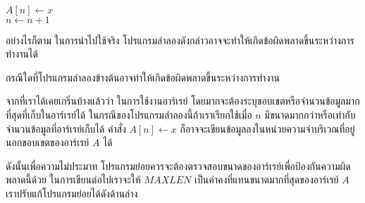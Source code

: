 \begin{algt}
\\
\hspace*{0.2in} $A[n] \leftarrow x$\\
\hspace*{0.2in} $n \leftarrow n + 1$
\end{algt}

อย่างไรก็ตาม ใน{\wbr}การ{\wbr}นำ{\wbr}ไป{\wbr}ใช้{\wbr}จริง โปรแกรม{\wbr}ลำ{\wbr}ลอง{\wbr}ดังกล่าว{\wbr}อาจ{\wbr}จะ{\wbr}ทำ{\wbr}ให้{\wbr}เกิด{\wbr}ข้อผิดพลาด{\wbr}ขึ้น{\wbr}ระหว่าง{\wbr}การ{\wbr}ทำงาน{\wbr}ได้{\wbr}

\begin{quiz}{}
กรณี{\wbr}ใด{\wbr}ที่{\wbr}โปรแกรม{\wbr}ลำ{\wbr}ลอง{\wbr}ข้างต้น{\wbr}อาจ{\wbr}ทำ{\wbr}ให้{\wbr}เกิด{\wbr}ข้อผิดพลาด{\wbr}ขึ้น{\wbr}ระหว่าง{\wbr}การ{\wbr}ทำงาน{\wbr}
\end{quiz}
\begin{quizans}
จาก{\wbr}ที่{\wbr}เรา{\wbr}ได้{\wbr}เคย{\wbr}เกริ่น{\wbr}บ้าง{\wbr}แล้ว{\wbr}ว่า ใน{\wbr}การ{\wbr}ใช้{\wbr}งาน{\wbr}อาร์เรย์
โดยมาก{\wbr}จะ{\wbr}ต้อง{\wbr}ระบุ{\wbr}ขอบเขต{\wbr}หรือ{\wbr}จำนวน{\wbr}ข้อมูล{\wbr}มาก{\wbr}ที่สุด{\wbr}ที่{\wbr}เก็บ{\wbr}ใน{\wbr}อาร์เรย์{\wbr}ได้{\wbr}
ใน{\wbr}กรณี{\wbr}ของ{\wbr}โปรแกรม{\wbr}ลำ{\wbr}ลอง{\wbr}นี้{\wbr}ถ้า{\wbr}เรา{\wbr}เรียก{\wbr}ใช้{\wbr}เมื่อ $n$
มี{\wbr}ขนาด{\wbr}มาก{\wbr}กว่า{\wbr}หรือ{\wbr}เท่า{\wbr}กับ{\wbr}จำนวน{\wbr}ข้อมูล{\wbr}ที่{\wbr}อาร์เรย์{\wbr}เก็บ{\wbr}ได้ คำสั่ง $A[n]\leftarrow x$
ก็{\wbr}อาจ{\wbr}จะ{\wbr}เขียน{\wbr}ข้อมูล{\wbr}ลง{\wbr}ใน{\wbr}หน่วยความจำ{\wbr}บริเวณ{\wbr}ที่อยู่{\wbr}นอก{\wbr}ขอบเขต{\wbr}ของ{\wbr}อาร์เรย์ $A$ ได้{\wbr}
\end{quizans}

ดังนั้น{\wbr}เพื่อ{\wbr}ความ{\wbr}ไม่{\wbr}ประมาท{\wbr}
โปรแกรมย่อย{\wbr}ควร{\wbr}จะ{\wbr}ต้อง{\wbr}ตรวจสอบ{\wbr}ขนาด{\wbr}ของ{\wbr}อาร์เรย์{\wbr}เพื่อ{\wbr}ป้องกัน{\wbr}ความผิด{\wbr}พลาด{\wbr}นี้{\wbr}ด้วย{\wbr}
ใน{\wbr}การ{\wbr}เขียน{\wbr}ต่อไป{\wbr}เรา{\wbr}จะ{\wbr}ให้ $MAXLEN$ เป็น{\wbr}ค่าคงที่{\wbr}แทน{\wbr}ขนาด{\wbr}มาก{\wbr}ที่สุด{\wbr}ของ{\wbr}อาร์เรย์ $A$
เรา{\wbr}ปรับ{\wbr}แก้{\wbr}โปรแกรมย่อย{\wbr}ได้{\wbr}ดัง{\wbr}ด้าน{\wbr}ล่าง{\wbr}

